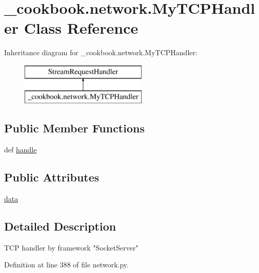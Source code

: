 \hypertarget{class__cookbook_1_1network_1_1MyTCPHandler}{\section{\-\_\-cookbook.\-network.\-My\-T\-C\-P\-Handler Class Reference}
\label{class__cookbook_1_1network_1_1MyTCPHandler}
}
Inheritance diagram for \-\_\-cookbook.\-network.\-My\-T\-C\-P\-Handler\-:\begin{figure}[H]
\begin{center}
\leavevmode
\includegraphics[height=2.000000cm]{dd/d15/class__cookbook_1_1network_1_1MyTCPHandler}
\end{center}
\end{figure}
\subsection*{Public Member Functions}
\begin{DoxyCompactItemize}
\item 
def \hyperlink{class__cookbook_1_1network_1_1MyTCPHandler_a31d7dcf17493e26af74799fc3fbda72a}{handle}
\end{DoxyCompactItemize}
\subsection*{Public Attributes}
\begin{DoxyCompactItemize}
\item 
\hyperlink{class__cookbook_1_1network_1_1MyTCPHandler_ae44f9a12a83a8bb057b192d612bda012}{data}
\end{DoxyCompactItemize}


\subsection{Detailed Description}
\begin{DoxyVerb}TCP handler by framework "SocketServer"
\end{DoxyVerb}
 

Definition at line 388 of file network.\-py.



